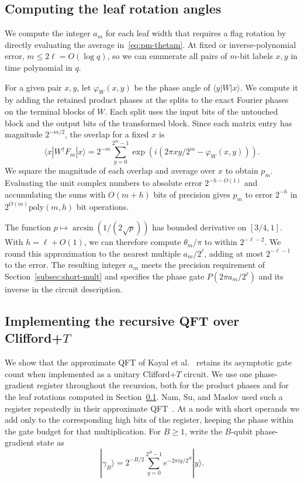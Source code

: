 \documentclass[11pt]{article}
\newcommand{\CFT}{Clifford+$T$}
\begin{document}
\subsection{Computing the leaf rotation angles}\label{subsec:leaf-rotations}

We compute the integer $a_m$ for each leaf width that requires a flag rotation by directly evaluating the average in~\eqref{eq:pm-thetam}. At fixed or inverse-polynomial error, $m\le 2\ell=O(\log q)$, so we can enumerate all pairs of $m$-bit labels $x,y$ in time polynomial in $q$.

For a given pair $x,y$, let $\varphi_W(x,y)$ be the phase angle of $\langle y|W|x\rangle$. We compute it by adding the retained product phases at the splits to the exact Fourier phases on the terminal blocks of $W$. Each split uses the input bits of the untouched block and the output bits of the transformed block. Since each matrix entry has magnitude $2^{-m/2}$, the overlap for a fixed $x$ is
\[
\langle x|W^\dagger F_m|x\rangle
=2^{-m}\sum_{y=0}^{2^m-1}
  \exp\!\left(i\left(2\pi xy/2^m-\varphi_W(x,y)\right)\right).
\]
We square the magnitude of each overlap and average over $x$ to obtain $p_m$. Evaluating the unit complex numbers to absolute error $2^{-h-O(1)}$ and accumulating the sums with $O(m+h)$ bits of precision gives $p_m$ to error $2^{-h}$ in $2^{O(m)}\mathrm{poly}(m,h)$ bit operations.

The function $p\mapsto \arcsin(1/(2\sqrt p))$ has bounded derivative on $[3/4,1]$. With $h=\ell+O(1)$, we can therefore compute $\theta_m/\pi$ to within $2^{-\ell-2}$. We round this approximation to the nearest multiple $a_m/2^\ell$, adding at most $2^{-\ell-1}$ to the error. The resulting integer $a_m$ meets the precision requirement of Section~\ref{subsec:short-mult} and specifies the phase gate $P(2\pi a_m/2^\ell)$ and its inverse in the circuit description.

\subsection{Implementing the recursive QFT over \texorpdfstring{\CFT}{Clifford+T}}\label{subsec:phase-gradient}

We show that the approximate QFT of Kayal et al.~\cite{kmps2026} retains its asymptotic gate count when implemented as a unitary \CFT{} circuit. We use one phase-gradient register throughout the recursion, both for the product phases and for the leaf rotations computed in Section~\ref{subsec:leaf-rotations}. Nam, Su, and Maslov used such a register repeatedly in their approximate QFT~\cite[Section~II]{nsm2020}. At a node with short operands we add only to the corresponding high bits of the register, keeping the phase within the gate budget for that multiplication. For $B\ge 1$, write the $B$-qubit phase-gradient state as
\begin{equation}\label{eq:phase-gradient}
|\gamma_B\rangle = 2^{-B/2} \sum_{y=0}^{2^B-1} e^{-2\pi i y/2^B} |y\rangle.
\end{equation}
\end{document}
